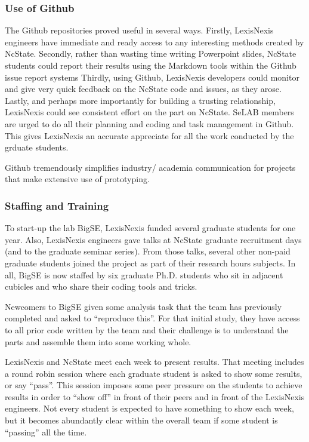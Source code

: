 \documentclass{sig-alternate-05-2015}
\theoremstyle{break}
\begin{document}
 \subsubsection{Use of Github}
The Github repositories proved useful in several  ways.
Firstly,
 LexisNexis  engineers have immediate and ready access to 
 any interesting methods created by NcState. 
Secondly,
rather than wasting time writing Powerpoint slides, NcState students could
report their results using the Markdown tools within the Github issue
report systems
Thirdly, using Github, LexisNexis developers could monitor and give very
quick feedback on the NcState code and issues,
as they arose.
Lastly, and perhaps more importantly for building
a trusting relationship,
LexisNexis could see consistent effort on the part on NcState. SeLAB members
are urged to do all their planning and coding and task management in Github.
This gives LexisNexis an accurate appreciate for all the work conducted
by the grduate students.
 \begin{lesson}
Github tremendously simplifies  industry/ academia communication for projects
that make extensive use of prototyping.
\end{lesson}

 \subsubsection{Staffing and Training}
To start-up the lab  BigSE, LexisNexis funded several graduate students for one year. Also,
LexisNexis engineers gave talks at NcState graduate recruitment days (and to
the graduate seminar series). From those talks, several other non-paid graduate students
joined the project as part of their research hours subjects. In all, BigSE is
now staffed by six graduate Ph.D. students who sit in adjacent cubicles and who
 share their coding tools and tricks. 

Newcomers to BigSE given some analysis task
 that the team has previously completed and asked to ``reproduce this''. For
 that initial study, they have access to all prior code written by the team
 and their challenge is to understand the parts and assemble them into some working
 whole. 
 
  LexisNexis and NcState meet each week to present results. That meeting includes
a round robin session where each graduate student is asked to show some results,
or say ``pass''. This session imposes some peer pressure on the students to achieve
results in order to ``show off'' in front of their peers and in front of the
LexisNexis engineers. Not every student is expected to have something to show each week,
but it becomes abundantly  clear within the overall team if some student is ``passing'' all
the time.
\end{document}
